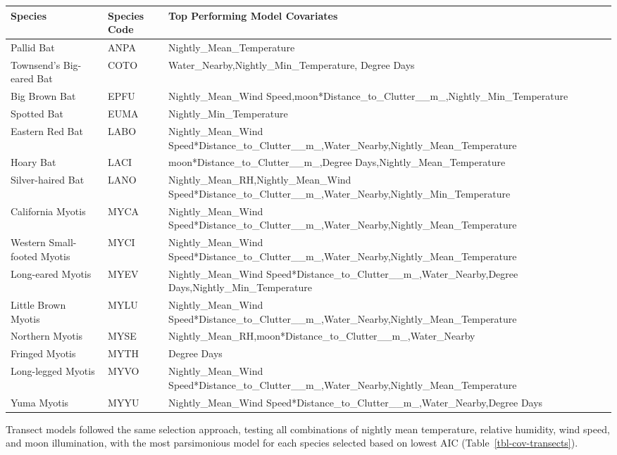 \documentclass[
  letterpaper,
  DIV=11,
  numbers=noendperiod]{scrartcl}
\begin{document}
\begin{longtable}[l]{>{\raggedright\arraybackslash}p{15em}>{\raggedright\arraybackslash}p{8em}>{\raggedright\arraybackslash}p{20em}}
\toprule
Species & Species Code & Top Performing Model Covariates\\
\midrule
Pallid Bat & ANPA & Nightly\_Mean\_Temperature\\
Townsend's Big-eared Bat & COTO & Water\_Nearby,Nightly\_Min\_Temperature, Degree Days\\
Big Brown Bat & EPFU & Nightly\_Mean\_Wind Speed,moon*Distance\_to\_Clutter\_\_m\_,Nightly\_Min\_Temperature\\
Spotted Bat & EUMA & Nightly\_Min\_Temperature\\
Eastern Red Bat & LABO & Nightly\_Mean\_Wind Speed*Distance\_to\_Clutter\_\_m\_,Water\_Nearby,Nightly\_Mean\_Temperature\\
\addlinespace
Hoary Bat & LACI & moon*Distance\_to\_Clutter\_\_m\_,Degree Days,Nightly\_Mean\_Temperature\\
Silver-haired Bat & LANO & Nightly\_Mean\_RH,Nightly\_Mean\_Wind Speed*Distance\_to\_Clutter\_\_m\_,Water\_Nearby,Nightly\_Min\_Temperature\\
California Myotis & MYCA & Nightly\_Mean\_Wind Speed*Distance\_to\_Clutter\_\_m\_,Water\_Nearby,Nightly\_Mean\_Temperature\\
Western Small-footed Myotis & MYCI & Nightly\_Mean\_Wind Speed*Distance\_to\_Clutter\_\_m\_,Water\_Nearby,Nightly\_Mean\_Temperature\\
Long-eared Myotis & MYEV & Nightly\_Mean\_Wind Speed*Distance\_to\_Clutter\_\_m\_,Water\_Nearby,Degree Days,Nightly\_Min\_Temperature\\
\addlinespace
Little Brown Myotis & MYLU & Nightly\_Mean\_Wind Speed*Distance\_to\_Clutter\_\_m\_,Water\_Nearby,Nightly\_Mean\_Temperature\\
Northern Myotis & MYSE & Nightly\_Mean\_RH,moon*Distance\_to\_Clutter\_\_m\_,Water\_Nearby\\
Fringed Myotis & MYTH & Degree Days\\
Long-legged Myotis & MYVO & Nightly\_Mean\_Wind Speed*Distance\_to\_Clutter\_\_m\_,Water\_Nearby,Nightly\_Mean\_Temperature\\
Yuma Myotis & MYYU & Nightly\_Mean\_Wind Speed*Distance\_to\_Clutter\_\_m\_,Water\_Nearby,Degree Days\\
\bottomrule

\end{longtable}

Transect models followed the same selection approach, testing all
combinations of nightly mean temperature, relative humidity, wind speed,
and moon illumination, with the most parsimonious model for each species
selected based on lowest AIC (Table~\ref{tbl-cov-transects}).
\end{document}
